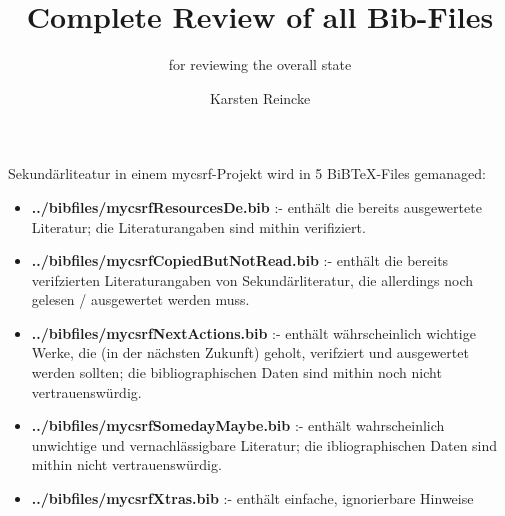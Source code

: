 \documentclass[DIV=calc,BCOR=5mm,11pt,headings=small,oneside,abstract=true,toc=bib]{scrartcl}
\begin{document}
\nocite{*}

\titlehead{Integrationstest: Deutsche Konfiguration}
\subject{BiBTeX-Files}
\title{Complete Review of all Bib-Files}
\subtitle{for reviewing the overall state}
\author{Karsten Reincke}

\maketitle

Sekundärliteatur in einem mycsrf-Projekt wird in  5 BiBTeX-Files gemanaged:

\begin{itemize}
  \item {\bfseries ../bibfiles/mycsrfResourcesDe.bib} :- enthält die
  bereits ausgewertete Literatur; die Literaturangaben sind mithin
  verifiziert.
  \item {\bfseries ../bibfiles/mycsrfCopiedButNotRead.bib} :- enthält
  die bereits verifzierten Literaturangaben von Sekundärliteratur,
  die allerdings noch gelesen / ausgewertet werden muss.
  \item {\bfseries ../bibfiles/mycsrfNextActions.bib} :- enthält
  währscheinlich wichtige Werke, die (in der nächsten Zukunft)
  geholt, verifziert und ausgewertet werden sollten; die bibliographischen
  Daten sind mithin noch nicht vertrauenswürdig.
  \item {\bfseries ../bibfiles/mycsrfSomedayMaybe.bib} :- enthält
  wahrscheinlich unwichtige und vernachlässigbare Literatur; die
  ibliographischen Daten sind mithin nicht vertrauenswürdig.
  \item {\bfseries ../bibfiles/mycsrfXtras.bib} :- enthält einfache,
  ignorierbare Hinweise
\end{itemize}

\small


\end{document}
